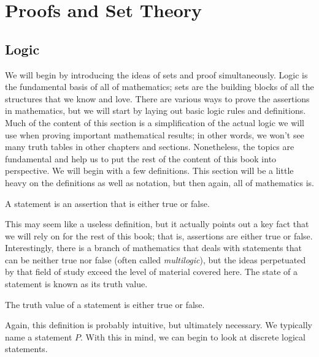 \chapter{Proofs and Set Theory}

\section{Logic}

We will begin by introducing the ideas of sets and proof simultaneously. Logic is the fundamental basis of all of mathematics; sets are the building blocks of all the structures that we know and love. There are various ways to prove the assertions in mathematics, but we will start by laying out basic logic rules and definitions. Much of the content of this section is a simplification of the actual logic we will use when proving important mathematical results; in other words, we won't see many truth tables in other chapters and sections. Nonetheless, the topics are fundamental and help us to put the rest of the content of this book into perspective. We will begin with a few definitions. This section will be a little heavy on the definitions as well as notation, but then again, all of mathematics is.

\begin{definition}{}
	A statement is an assertion that is either true or false.
\end{definition}

This may seem like a useless definition, but it actually points out a key fact that we will rely on for the rest of this book; that is, assertions are either true or false. Interestingly, there is a branch of mathematics that deals with statements that can be neither true nor false (often called \textit{multilogic}), but the ideas perpetuated by that field of study exceed the level of material covered here. The state of a statement is known as its truth value.

\begin{definition}{}
	The truth value of a statement is either true or false.
\end{definition}

Again, this definition is probably intuitive, but ultimately necessary. We typically name a statement $P$. With this in mind, we can begin to look at discrete logical statements.

